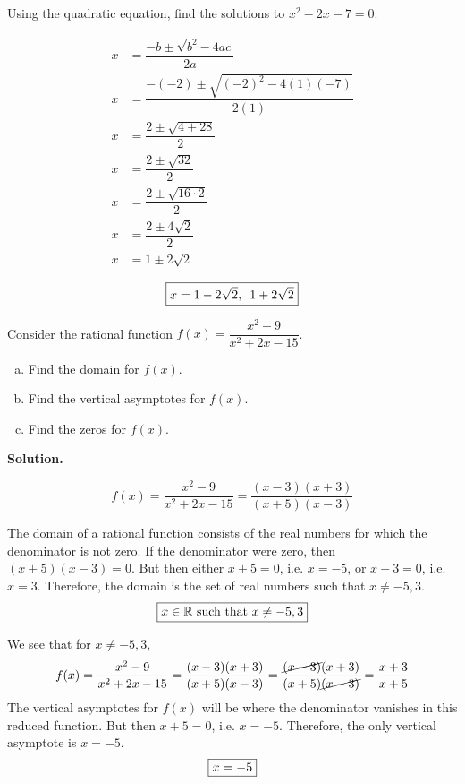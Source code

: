 \documentclass[12pt,letterpaper]{exam}
\begin{document}
\begin{questions}
\newpage
\question[5] Using the quadratic equation, find the solutions to $x^2 - 2x - 7= 0$. \pspace

	\[
	\begin{aligned}
	x&= \dfrac{-b \pm \sqrt{b^2 - 4ac}}{2a} \\[0.3cm]
	x&= \dfrac{-(-2) \pm \sqrt{(-2)^2 - 4(1)(-7)}}{2(1)} \\[0.3cm]
	x&= \dfrac{2 \pm \sqrt{4 + 28}}{2} \\[0.3cm]
	x&= \dfrac{2 \pm \sqrt{32}}{2} \\[0.3cm]
	x&= \dfrac{2 \pm \sqrt{16 \cdot 2}}{2} \\[0.3cm]
	x&= \dfrac{2 \pm 4\sqrt{2}}{2} \\[0.3cm]
	x&= 1 \pm 2 \sqrt{2}
	\end{aligned}
	\] \pspace
	
	\[
	\boxed{x= 1 - 2\sqrt{2},\enskip 1 + 2\sqrt{2}}
	\]





\newpage
\question[10] Consider the rational function $f(x)= \dfrac{x^2 - 9}{x^2 + 2x - 15}$. 
\begin{enumerate}[(a)]
\item Find the domain for $f(x)$. 
\item Find the vertical asymptotes for $f(x)$. 
\item Find the zeros for $f(x)$. 
\end{enumerate} \pspace

{\noindent\bfseries Solution.}

	\[
	f(x)= \dfrac{x^2 - 9}{x^2 + 2x - 15}= \dfrac{(x - 3)(x + 3)}{(x + 5)(x - 3)}
	\] \pspace

\begin{enumerate}[(a)]
{\itshape
\item The domain of a rational function consists of the real numbers for which the denominator is not zero. If the denominator were zero, then $(x + 5)(x - 3)= 0$. But then either $x + 5= 0$, i.e. $x= -5$, or $x - 3= 0$, i.e. $x= 3$. Therefore, the domain is the set of real numbers such that $x \neq -5, 3$. 
	\[
	\boxed{%
	x \in \mathbb{R} \text{ such that } x \neq -5, 3
	}
	\] \pspace

\item We see that for $x \neq -5, 3$, 
	\[
	f(x)= \dfrac{x^2 - 9}{x^2 + 2x - 15}= \dfrac{(x - 3)(x + 3)}{(x + 5)(x - 3)}= \dfrac{\cancel{(x - 3)}(x + 3)}{(x + 5)\cancel{(x - 3)}}= \dfrac{x + 3}{x + 5}
	\]
The vertical asymptotes for $f(x)$ will be where the denominator vanishes in this reduced function. But then $x + 5= 0$, i.e. $x= -5$. Therefore, the only vertical asymptote is $x= -5$. 
	\[
	\boxed{%
	x= -5
	}
	\] \pspace

}
\end{enumerate}
\end{questions}
\end{document}
